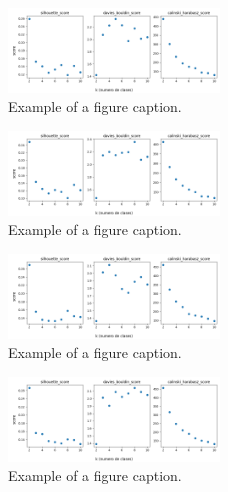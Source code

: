 \begin{figure}[htbp]
\centerline{\includegraphics[width=0.5\textwidth]{graficos_experimentos/gmm/caracteristicos0_pca0.9.png}}
\caption{Example of a figure caption.}
\label{graficos_experimentos/gmm/caracteristicos0_pca0.9.png}
\end{figure}
 
\begin{figure}[htbp]
\centerline{\includegraphics[width=0.5\textwidth]{graficos_experimentos/gmm/caracteristicos0_pca0.95.png}}
\caption{Example of a figure caption.}
\label{graficos_experimentos/gmm/caracteristicos0_pca0.95.png}
\end{figure}
 
\begin{figure}[htbp]
\centerline{\includegraphics[width=0.5\textwidth]{graficos_experimentos/gmm/caracteristicos1_pca0.9.png}}
\caption{Example of a figure caption.}
\label{graficos_experimentos/gmm/caracteristicos1_pca0.9.png}
\end{figure}
 
\begin{figure}[htbp]
\centerline{\includegraphics[width=0.5\textwidth]{graficos_experimentos/gmm/caracteristicos1_pca0.95.png}}
\caption{Example of a figure caption.}
\label{graficos_experimentos/gmm/caracteristicos1_pca0.95.png}
\end{figure}
 
